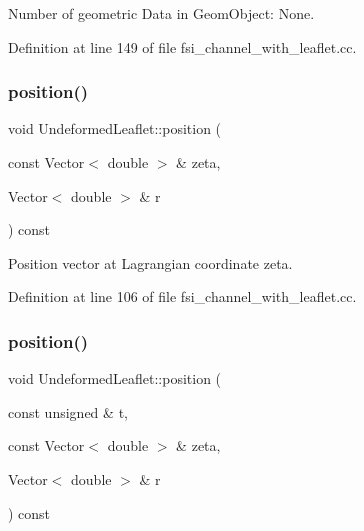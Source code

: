 Number of geometric Data in Geom\+Object\+: None. 



Definition at line 149 of file fsi\+\_\+channel\+\_\+with\+\_\+leaflet.\+cc.

\mbox{\label{classUndeformedLeaflet_a8e9b79702eb9a38e19886b84aeb47918}} 
\subsubsection{\texorpdfstring{position()}{position()}\hspace{0.1cm}{\footnotesize\ttfamily [1/2]}}
{\footnotesize\ttfamily void Undeformed\+Leaflet\+::position (\begin{DoxyParamCaption}\item[{const Vector$<$ double $>$ \&}]{zeta,  }\item[{Vector$<$ double $>$ \&}]{r }\end{DoxyParamCaption}) const\hspace{0.3cm}{\ttfamily [inline]}}



Position vector at Lagrangian coordinate zeta. 



Definition at line 106 of file fsi\+\_\+channel\+\_\+with\+\_\+leaflet.\+cc.

\mbox{\label{classUndeformedLeaflet_a6949784da1030dd63ef741d170ef9798}} 
\subsubsection{\texorpdfstring{position()}{position()}\hspace{0.1cm}{\footnotesize\ttfamily [2/2]}}
{\footnotesize\ttfamily void Undeformed\+Leaflet\+::position (\begin{DoxyParamCaption}\item[{const unsigned \&}]{t,  }\item[{const Vector$<$ double $>$ \&}]{zeta,  }\item[{Vector$<$ double $>$ \&}]{r }\end{DoxyParamCaption}) const\hspace{0.3cm}{\ttfamily [inline]}}



